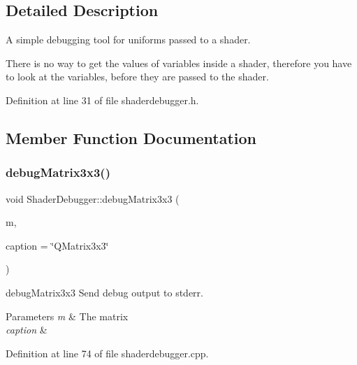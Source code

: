 \subsection{Detailed Description}
A simple debugging tool for uniforms passed to a shader. 

There is no way to get the values of variables inside a shader, therefore you have to look at the variables, before they are passed to the shader. 

Definition at line 31 of file shaderdebugger.\+h.



\subsection{Member Function Documentation}
\mbox{\label{class_shader_debugger_a6fd11ef28da124fd558f329d55629ee8}} 
\subsubsection{\texorpdfstring{debugMatrix3x3()}{debugMatrix3x3()}}
{\footnotesize\ttfamily void Shader\+Debugger\+::debug\+Matrix3x3 (\begin{DoxyParamCaption}\item[{const Q\+Matrix3x3 \&}]{m,  }\item[{const Q\+String \&}]{caption = {\ttfamily \char`\"{}QMatrix3x3\char`\"{}} }\end{DoxyParamCaption})\hspace{0.3cm}{\ttfamily [static]}}



debug\+Matrix3x3 Send debug output to stderr. 


\begin{DoxyParams}{Parameters}
{\em m} & The matrix \\
\hline
{\em caption} & \\
\hline
\end{DoxyParams}


Definition at line 74 of file shaderdebugger.\+cpp.

\mbox{\label{class_shader_debugger_a45249372f2e0c1e5bda7d200bb0dbfa8}} 
